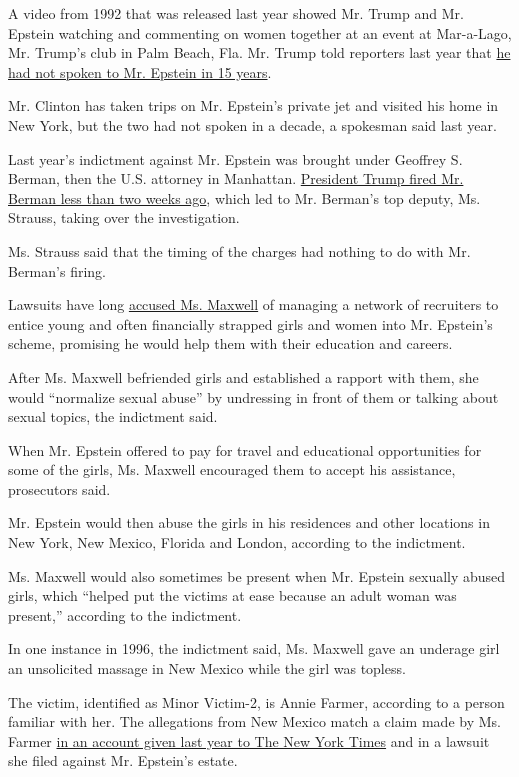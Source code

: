 A video from 1992 that was released last year showed Mr. Trump and Mr.
Epstein watching and commenting on women together at an event at
Mar-a-Lago, Mr. Trump's club in Palm Beach, Fla. Mr. Trump told
reporters last year that
\href{https://www.nytimes.com/2019/07/17/us/politics/trump-jeffrey-epstein-video.html}{he
had not spoken to Mr. Epstein in 15 years}.

Mr. Clinton has taken trips on Mr. Epstein's private jet and visited his
home in New York, but the two had not spoken in a decade, a spokesman
said last year.

Last year's indictment against Mr. Epstein was brought under Geoffrey S.
Berman, then the U.S. attorney in Manhattan.
\href{https://www.nytimes.com/2020/06/20/nyregion/trump-geoffrey-berman-fired-sdny.html}{President
Trump fired Mr. Berman less than two weeks ago}, which led to Mr.
Berman's top deputy, Ms. Strauss, taking over the investigation.

Ms. Strauss said that the timing of the charges had nothing to do with
Mr. Berman's firing.

Lawsuits have long
\href{https://www.nytimes.com/2019/08/14/style/ghislaine-maxwell-terramar-boats-jeffrey-epstein.html}{accused
Ms. Maxwell} of managing a network of recruiters to entice young and
often financially strapped girls and women into Mr. Epstein's scheme,
promising he would help them with their education and careers.

After Ms. Maxwell befriended girls and established a rapport with them,
she would ``normalize sexual abuse'' by undressing in front of them or
talking about sexual topics, the indictment said.

When Mr. Epstein offered to pay for travel and educational opportunities
for some of the girls, Ms. Maxwell encouraged them to accept his
assistance, prosecutors said.

Mr. Epstein would then abuse the girls in his residences and other
locations in New York, New Mexico, Florida and London, according to the
indictment.

Ms. Maxwell would also sometimes be present when Mr. Epstein sexually
abused girls, which ``helped put the victims at ease because an adult
woman was present,'' according to the indictment.

In one instance in 1996, the indictment said, Ms. Maxwell gave an
underage girl an unsolicited massage in New Mexico while the girl was
topless.

The victim, identified as Minor Victim-2, is Annie Farmer, according to
a person familiar with her. The allegations from New Mexico match a
claim made by Ms. Farmer
\href{https://www.nytimes.com/2019/08/26/us/epstein-farmer-sisters-maxwell.html}{in
an account given last year to The New York Times} and in a lawsuit she
filed against Mr. Epstein's estate.


